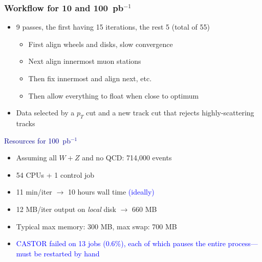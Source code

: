 \documentclass[compress]{beamer}
\begin{document}
\begin{frame}
\frametitle{Workflow for 10 and 100~pb$^{-1}$}
\begin{itemize}
\item 9 passes, the first having 15 iterations, the rest 5 (total of 55)
\begin{itemize}
\item First align wheels and disks, slow convergence
\item Next align innermost muon stations
\item Then fix innermost and align next, etc.
\item Then allow everything to float when close to optimum
\end{itemize}
\item Data selected by a $p_T$ cut and a new track cut that rejects highly-scattering tracks
\end{itemize}

\vfill
\hspace{-0.83 cm} \textcolor{darkblue}{\Large Resources for 100~pb$^{-1}$}
\begin{itemize}
\item Assuming all $W+Z$ and no QCD: 714,000 events
\item 54 CPUs + 1 control job
\item 11 min/iter $\to$ 10 hours wall time \textcolor{blue}{(ideally)}
\item 12 MB/iter output on {\it local} disk $\to$ 660 MB
\item Typical max memory: 300 MB, max swap: 700 MB
\item \textcolor{blue}{CASTOR failed on 13 jobs (0.6\%), each of which pauses the entire process--- must be restarted by hand}
\end{itemize}
\end{frame}
\end{document}
